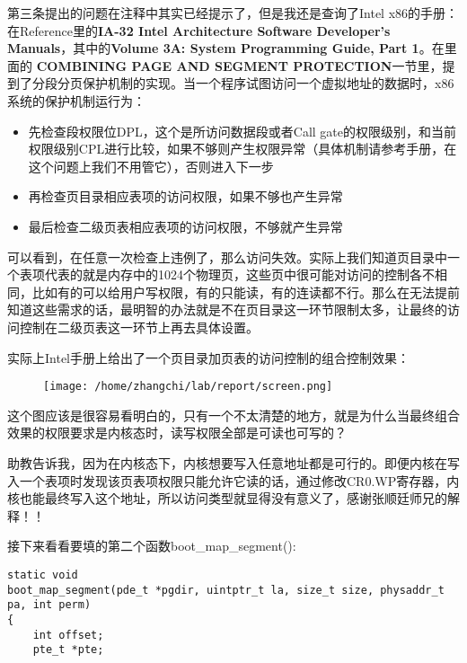 \documentclass{article}
\newcommand{\funcname}[1]{{\ttfamily \small #1}}
\begin{document}
\begin{CJK*}{UTF8}{gkai}
第三条提出的问题在注释中其实已经提示了，但是我还是查询了Intel x86的手册：在Reference里的{\ttfamily \bfseries IA-32 Intel Architecture Software Developer's Manuals}，其中的{\ttfamily \bfseries Volume 3A: System Programming Guide, Part 1}。在里面的{\ttfamily \bfseries \color{red} COMBINING PAGE AND SEGMENT PROTECTION}一节里，提到了分段分页保护机制的实现。当一个程序试图访问一个虚拟地址的数据时，x86系统的保护机制运行为：

\begin{itemize}
\item{先检查段权限位DPL，这个是所访问数据段或者Call gate的权限级别，和当前权限级别CPL进行比较，如果不够则产生权限异常（具体机制请参考手册，在这个问题上我们不用管它），否则进入下一步}
\item{再检查页目录相应表项的访问权限，如果不够也产生异常}
\item{最后检查二级页表相应表项的访问权限，不够就产生异常}
\end{itemize}

可以看到，在任意一次检查上违例了，那么访问失效。实际上我们知道页目录中一个表项代表的就是内存中的1024个物理页，这些页中很可能对访问的控制各不相同，比如有的可以给用户写权限，有的只能读，有的连读都不行。那么在无法提前知道这些需求的话，最明智的办法就是不在页目录这一环节限制太多，让最终的访问控制在二级页表这一环节上再去具体设置。

实际上Intel手册上给出了一个页目录加页表的访问控制的组合控制效果：

\begin{figure}[htp]
\centering
\texttt{[image: /home/zhangchi/lab/report/screen.png]}
\end{figure}

这个图应该是很容易看明白的，只有一个不太清楚的地方，就是为什么当最终组合效果的权限要求是内核态时，读写权限全部是可读也可写的？

助教告诉我，因为在内核态下，内核想要写入任意地址都是可行的。即便内核在写入一个表项时发现该页表项权限只能允许它读的话，通过修改CR0.WP寄存器，内核也能最终写入这个地址，所以访问类型就显得没有意义了，感谢张顺廷师兄的解释！！

接下来看看要填的第二个函数\funcname{boot\_map\_segment()}:



\begin{lstlisting}[style=ccode, title={\scriptsize \ttfamily \bfseries kern/pmap.c: boot\_map\_segment ()}]
static void
boot_map_segment(pde_t *pgdir, uintptr_t la, size_t size, physaddr_t pa, int perm)
{
    int offset;
    pte_t *pte;


\end{lstlisting}
\end{CJK*}
\end{document}
